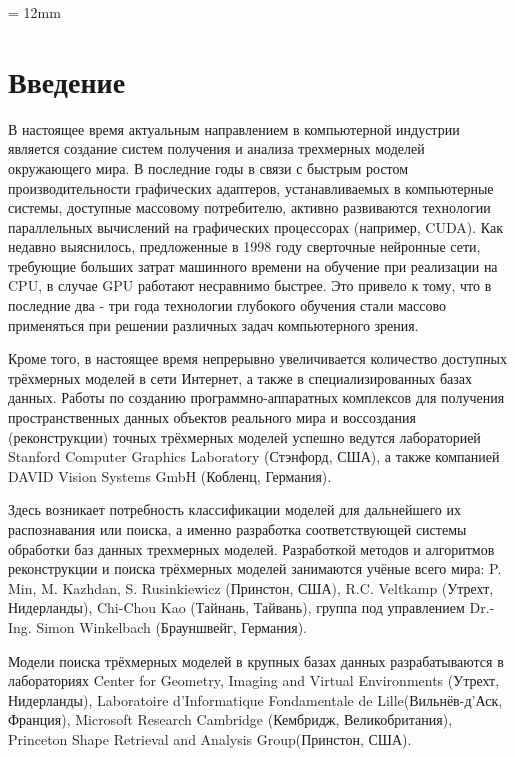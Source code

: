 \documentclass[14pt]{article}
\numberwithin{figure}{section}
\numberwithin{equation}{section}
\begin{document}
{}
\parindent = 12mm



\tableofcontents

\newpage

\section*{Введение}

В настоящее время актуальным направлением в компьютерной индустрии является создание систем получения и анализа трехмерных моделей окружающего мира. В последние годы в связи с быстрым ростом производительности графических адаптеров, устанавливаемых в компьютерные системы, доступные массовому потребителю, активно развиваются технологии параллельных вычислений на графических процессорах (например, CUDA). Как недавно выяснилось, предложенные в 1998 году сверточные нейронные сети, требующие больших затрат машинного времени на обучение при реализации на CPU, в случае GPU работают несравнимо быстрее. Это привело к тому, что в последние два - три года технологии глубокого обучения стали массово применяться при решении различных задач компьютерного зрения.

Кроме того, в настоящее время непрерывно увеличивается количество доступных трёхмерных моделей в сети Интернет, а также в специализированных базах данных. %
Работы по созданию программно-аппаратных комплексов для получения пространственных данных объектов реального мира и воссоздания (реконструкции) точных трёхмерных моделей успешно ведутся лабораторией Stanford Computer Graphics Laboratory (Стэнфорд, США), а также компанией DAVID Vision Systems GmbH (Кобленц, Германия). %

Здесь возникает потребность классификации моделей для дальнейшего их распознавания или поиска, а именно разработка соответствующей системы обработки баз данных трехмерных моделей. %
Разработкой методов и алгоритмов реконструкции и поиска трёхмерных моделей занимаются учёные всего мира: P. Min, M. Kazhdan, S. Rusinkiewicz (Принстон, США), R.C. Veltkamp (Утрехт, Нидерланды), Chi-Chou Kao (Тайнань, Тайвань), группа под управлением Dr.-Ing. Simon Winkelbach (Брауншвейг, Германия).

Модели поиска трёхмерных моделей в крупных базах данных разрабатываются в лабораториях Center for Geometry, Imaging and Virtual Environments (Утрехт, Нидерланды), Laboratoire d'Informatique Fondamentale de Lille(Вильнёв-д’Аск, Франция), Microsoft Research Cambridge (Кембридж, Великобритания), Princeton Shape Retrieval and Analysis Group(Принстон, США).%
\end{document}
